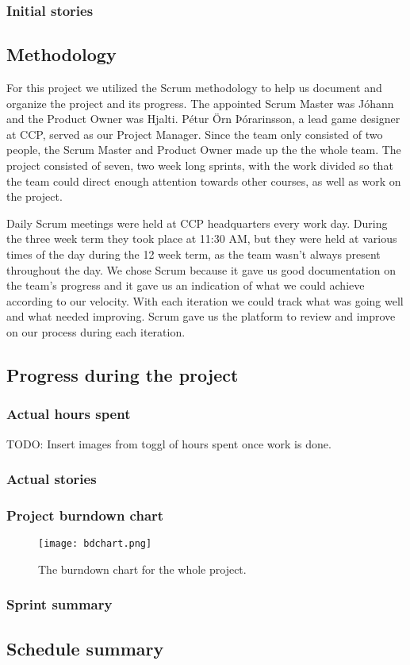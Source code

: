	\subsubsection{Initial stories}


\subsection{Methodology}
	For this project we utilized the Scrum methodology to help us document and organize the project and its progress. The appointed Scrum Master was Jóhann and the Product Owner was Hjalti. Pétur Örn Þórarinsson, a lead game designer at CCP, served as our Project Manager. Since the team only consisted of two people, the Scrum Master and Product Owner made up the the whole team. The project consisted of seven, two week long sprints, with the work divided so that the team could direct enough attention towards other courses, as well as work on the project.

	Daily Scrum meetings were held at CCP headquarters every work day. During the three week term they took place at 11:30 AM, but they were held at various times of the day during the 12 week term, as the team wasn't always present throughout the day. We chose Scrum because it gave us good documentation on the team's progress and it gave us an indication of what we could achieve according to our velocity. With each iteration we could track what was going well and what needed improving. Scrum gave us the platform to review and improve on our process during each iteration.

\subsection{Progress during the project}

	\subsubsection{Actual hours spent}

	TODO: Insert images from toggl of hours spent once work is done.
	
	\subsubsection{Actual stories}

	\subsubsection{Project burndown chart}
		
		\begin{figure}[H]
		  \centering
		  \graphicspath{ {./graphics/} }
		  \centerline{\texttt{[image: bdchart.png]}}
		  \caption{\label{fig:bdchart} The burndown chart for the whole project.}
		\end{figure}

	\subsubsection{Sprint summary}

\subsection{Schedule summary}
